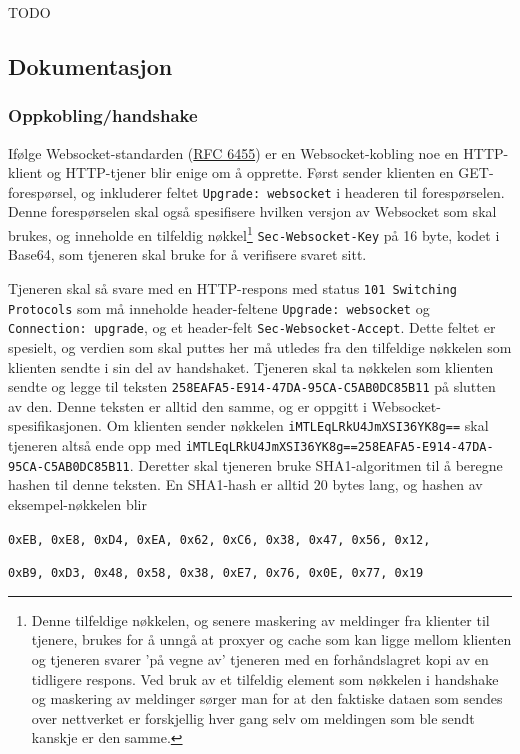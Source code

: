 \documentclass{article}
\newcommand{\code}[1]{\colorbox{light-gray}{\texttt{#1}}}
\begin{document}
TODO

\subsection*{Dokumentasjon}
\subsubsection*{Oppkobling/handshake}

Ifølge Websocket-standarden (\href{https://www.rfc-editor.org/rfc/rfc6455.html}{RFC 6455}) er en Websocket-kobling noe en HTTP-klient og HTTP-tjener blir enige om å opprette. Først sender klienten en GET-forespørsel, og inkluderer feltet \code{Upgrade: websocket} i headeren til forespørselen. Denne forespørselen skal også spesifisere hvilken versjon av Websocket som skal brukes, og inneholde en tilfeldig nøkkel\footnote{Denne tilfeldige nøkkelen, og senere maskering av meldinger fra klienter til tjenere, brukes for å unngå at proxyer og cache som kan ligge mellom klienten og tjeneren svarer 'på vegne av' tjeneren med en forhåndslagret kopi av en tidligere respons. Ved bruk av et tilfeldig element som nøkkelen i handshake og maskering av meldinger sørger man for at den faktiske dataen som sendes over nettverket er forskjellig hver gang selv om meldingen som ble sendt kanskje er den samme.} \code{Sec-Websocket-Key} på 16 byte, kodet i Base64, som tjeneren skal bruke for å verifisere svaret sitt.

Tjeneren skal så svare med en HTTP-respons med status \code{101 Switching Protocols} som må inneholde header-feltene \code{Upgrade: websocket} og \code{Connection: upgrade}, og et header-felt \code{Sec-Websocket-Accept}. Dette feltet er spesielt, og verdien som skal puttes her må utledes fra den tilfeldige nøkkelen som klienten sendte i sin del av handshaket. Tjeneren skal ta nøkkelen som klienten sendte og legge til teksten \code{258EAFA5-E914-47DA-95CA-C5AB0DC85B11} på slutten av den. Denne teksten er alltid den samme, og er oppgitt i Websocket-spesifikasjonen. Om klienten sender nøkkelen \code{iMTLEqLRkU4JmXSI36YK8g==} skal tjeneren altså ende opp med \code{iMTLEqLRkU4JmXSI36YK8g==258EAFA5-E914-47DA-95CA-C5AB0DC85B11}. Deretter skal tjeneren bruke SHA1-algoritmen til å beregne hashen til denne teksten. En SHA1-hash er alltid 20 bytes lang, og hashen av eksempel-nøkkelen blir

\code{0xEB, 0xE8, 0xD4, 0xEA, 0x62, 0xC6, 0x38, 0x47, 0x56, 0x12,}

\code{0xB9, 0xD3, 0x48, 0x58, 0x38, 0xE7, 0x76, 0x0E, 0x77, 0x19 }
\end{document}

